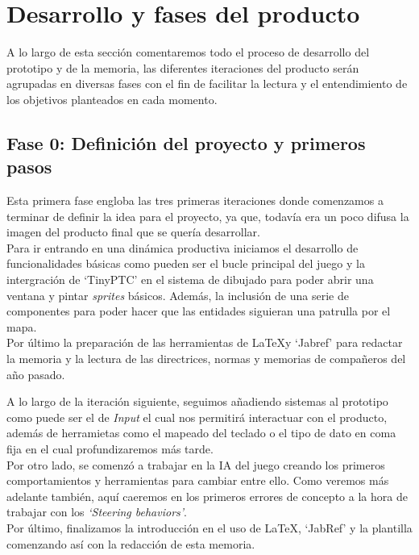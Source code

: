 \chapter{Desarrollo y fases del producto}
A lo largo de esta sección comentaremos todo el proceso de desarrollo del prototipo y de la 
memoria, las diferentes iteraciones del producto serán agrupadas en diversas fases con el fin
de facilitar la lectura y el entendimiento de los objetivos planteados en cada momento.   

\section{Fase 0: Definición del proyecto y primeros pasos}
Esta primera fase engloba las tres primeras iteraciones donde comenzamos a terminar de definir 
la idea para el proyecto, ya que, todavía era un poco difusa la imagen del producto final que se
quería desarrollar. \\
Para ir entrando en una dinámica productiva iniciamos el desarrollo de 
funcionalidades básicas como pueden ser el bucle principal del juego y la intergración de `TinyPTC'
en el sistema de dibujado para poder abrir una ventana y pintar \textit{sprites} básicos. Además,
la inclusión de una serie de componentes para poder hacer que las entidades siguieran una patrulla 
por el mapa.\\
Por último la preparación de las herramientas de \LaTeX y `Jabref' para redactar la memoria y
la lectura de las directrices, normas y memorias de compañeros del año pasado.

A lo largo de la iteración siguiente, seguimos añadiendo sistemas al prototipo como puede ser el
de \textit{Input} el cual nos permitirá interactuar con el producto, además de herramietas
como el mapeado del teclado o el tipo de dato en coma fija en el cual profundizaremos más tarde.\\
Por otro lado, se comenzó a trabajar en la \ac{IA} del juego creando los primeros comportamientos
y herramientas para cambiar entre ello. Como veremos más adelante también, aquí caeremos en los primeros
errores de concepto a la hora de trabajar con los \textit{`Steering behaviors'}.\\
Por último, finalizamos la introducción en el uso de \LaTeX, `JabRef' y la plantilla comenzando 
así con la redacción de esta memoria.

